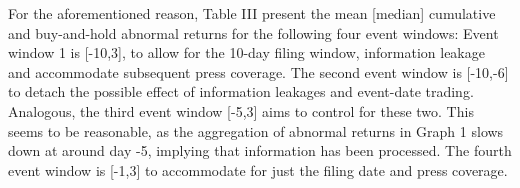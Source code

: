 \documentclass[12pt]{article}
\begin{document}
For the aforementioned reason, Table III present the mean [median] cumulative and buy-and-hold abnormal returns for the following four event windows: Event window 1 is [-10,3], to allow for the 10-day filing window, information leakage and accommodate subsequent press coverage. The second event window is [-10,-6] to detach the possible effect of information leakages and event-date trading. Analogous, the third event window [-5,3] aims to control for these two. This seems to be reasonable, as the aggregation of abnormal returns in Graph 1 slows down at around day -5, implying that information has been processed. The fourth event window is [-1,3] to accommodate for just the filing date and press coverage.


\end{document}
